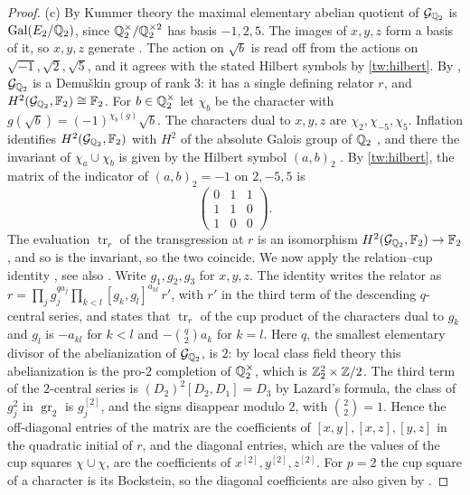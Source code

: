\begin{proof}
(c) By Kummer theory the maximal elementary abelian quotient of
$\mathcal G_{\mathbb Q_2}$ is $\operatorname{Gal}(E_2/\mathbb Q_2)$, since $\mathbb Q_2^\times/\mathbb Q_2^{\times2}$
has basis $-1,2,5$. The images of $x,y,z$ form a basis of it, so $x,y,z$
generate \cite[Proposition~3.9.1]{NeukirchSchmidtWingberg2008}. The action on
$\sqrt b$ is read off from the actions on $\sqrt{-1},\sqrt2,\sqrt5$, and it
agrees with the stated Hilbert symbols by \eqref{tw:hilbert}. By
\cite[Theorem~7.5.11]{NeukirchSchmidtWingberg2008}, $\mathcal G_{\mathbb Q_2}$ is a
Demu\v skin group of rank $3$: it has a single defining relator $r$, and
$H^2(\mathcal G_{\mathbb Q_2},\mathbb F_2)\cong\mathbb F_2$. For $b\in\mathbb Q_2^\times$ let $\chi_b$
be the character with $g(\sqrt b)=(-1)^{\chi_b(g)}\sqrt b$. The characters
dual to $x,y,z$ are $\chi_2,\chi_{-5},\chi_5$. Inflation identifies
$H^2(\mathcal G_{\mathbb Q_2},\mathbb F_2)$ with $H^2$ of the absolute Galois group of
$\mathbb Q_2$ \cite[Proposition~7.5.8]{NeukirchSchmidtWingberg2008}, and there the
invariant of $\chi_a\cup\chi_b$ is given by the Hilbert symbol $(a,b)_2$
\cite[Chapter~III, Section~4]{MilneCFT}. By \eqref{tw:hilbert}, the matrix of
the indicator of $(a,b)_2=-1$ on $2,-5,5$ is
\[
 \begin{pmatrix}0&1&1\\1&1&0\\1&0&0\end{pmatrix}.
\]
The evaluation $\operatorname{tr}_r$ of the transgression at $r$ is an
isomorphism $H^2(\mathcal G_{\mathbb Q_2},\mathbb F_2)\to\mathbb F_2$
\cite[Proposition~3.9.12(iii)]{NeukirchSchmidtWingberg2008}, and so is the
invariant, so the two coincide. We now apply the relation--cup identity
\cite[Proposition~3.9.13(ii)]{NeukirchSchmidtWingberg2008}, see also
\cite[Proposition~3.2]{Quadrelli2021}. Write $g_1,g_2,g_3$ for $x,y,z$. The
identity writes the relator as
$r=\prod_jg_j^{qa_j}\prod_{k<l}[g_k,g_l]^{a_{kl}}\,r'$, with $r'$ in the
third term of the descending $q$-central series, and states that
$\operatorname{tr}_r$ of the cup product of the characters dual to $g_k$ and
$g_l$ is $-a_{kl}$ for $k<l$ and $-\binom q2a_k$ for $k=l$. Here $q$, the
smallest elementary divisor of the
abelianization of $\mathcal G_{\mathbb Q_2}$, is $2$: by local class field theory
this abelianization is the pro-$2$ completion of $\mathbb Q_2^\times$, which is
$\mathbb Z_2^2\times\mathbb Z/2$. The third term of the $2$-central series is
$(D_2)^2[D_2,D_1]=D_3$ by Lazard's formula, the class of $g_j^2$ in
$\operatorname{gr}_2$ is $g_j^{[2]}$, and the signs disappear modulo $2$,
with $\binom22=1$. Hence the off-diagonal entries of the matrix are the
coefficients of $[x,y],[x,z],[y,z]$ in the quadratic initial of $r$, and the
diagonal entries, which are the values of the cup squares $\chi\cup\chi$,
are the coefficients of $x^{[2]},y^{[2]},z^{[2]}$. For $p=2$ the cup square
of a character is its Bockstein, so the diagonal coefficients are also given
by \cite[Proposition~3.9.14]{NeukirchSchmidtWingberg2008}.
\end{proof}

